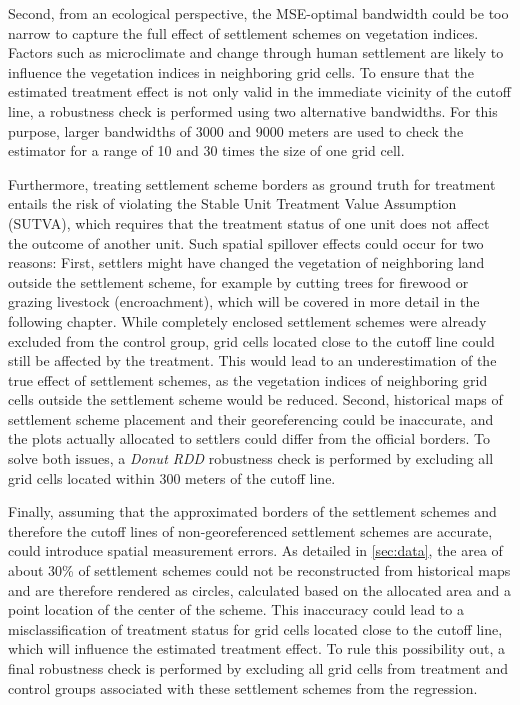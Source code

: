 Second, from an ecological perspective, the MSE-optimal bandwidth could be too narrow to capture the full effect of settlement schemes on vegetation indices.
Factors such as microclimate and change through human settlement are likely to influence the vegetation indices in neighboring grid cells.
To ensure that the estimated treatment effect is not only valid in the immediate vicinity of the cutoff line, a robustness check is performed using two alternative bandwidths.
For this purpose, larger bandwidths of 3000 and 9000 meters are used to check the estimator for a range of 10 and 30 times the size of one grid cell.

Furthermore, treating settlement scheme borders as ground truth for treatment entails the risk of violating the Stable Unit Treatment Value Assumption (SUTVA),
which requires that the treatment status of one unit does not affect the outcome of another unit.
Such spatial spillover effects could occur for two reasons:
First, settlers might have changed the vegetation of neighboring land outside the settlement scheme, for example by cutting trees for firewood or grazing livestock (encroachment),
which will be covered in more detail in the following chapter.
While completely enclosed settlement schemes were already excluded from the control group, grid cells located close to the cutoff line could still be affected by the treatment.
This would lead to an underestimation of the true effect of settlement schemes, as the vegetation indices of neighboring grid cells outside the settlement scheme would be reduced.
Second, historical maps of settlement scheme placement and their georeferencing could be inaccurate, and the plots actually allocated to settlers could differ from the official borders.
To solve both issues, a \textit{Donut RDD} robustness check is performed by excluding all grid cells located within 300 meters of the cutoff line.

Finally, assuming that the approximated borders of the settlement schemes and therefore the cutoff lines of non-georeferenced settlement schemes are accurate, could introduce spatial measurement errors.
As detailed in \cref{sec:data}, the area of about 30\% of settlement schemes could not be reconstructed from historical maps and are therefore rendered as circles,
calculated based on the allocated area and a point location of the center of the scheme.
This inaccuracy could lead to a misclassification of treatment status for grid cells located close to the cutoff line, which will influence the estimated treatment effect.
To rule this possibility out, a final robustness check is performed by excluding all grid cells from treatment and control groups associated with these settlement schemes from the regression.